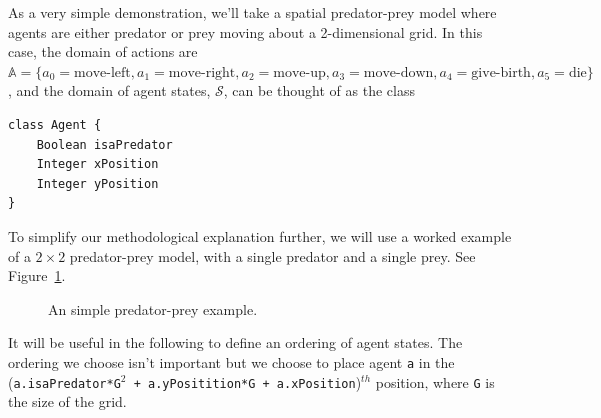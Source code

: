 \documentclass{article}
\begin{document}
As a very simple demonstration, we'll take a spatial predator-prey model where agents are either predator or prey moving about a 2-dimensional grid. In this case, the domain of actions are $\mathbb{A} = \{ a_0=\textrm{move-left}, a_1=\textrm{move-right}, a_2=\textrm{move-up}, a_3=\textrm{move-down}, a_4=\textrm{give-birth}, a_5=\textrm{die}\}$, and the domain of agent states, $\mathcal{S}$, can be thought of as the class 
\begin{lstlisting}
class Agent {
	Boolean	isaPredator
	Integer	xPosition
	Integer	yPosition
}
\end{lstlisting}
To simplify our methodological explanation further, we will use a worked example of a $2\times2$ predator-prey model, with a single predator and a single prey. See Figure~\ref{fig:AB-MCMC-1}.

\begin{figure}
	\centering
	\caption{An simple predator-prey example.\label{fig:AB-MCMC-1}}
\end{figure} %

It will be useful in the following to define an ordering of agent states. The ordering we choose isn't important but we choose to place agent \texttt{a} in the (\texttt{a.isaPredator*G$^2$ + a.yPositition*G + a.xPosition})$^{th}$ position, where \texttt{G} is the size of the grid.
\end{document}
